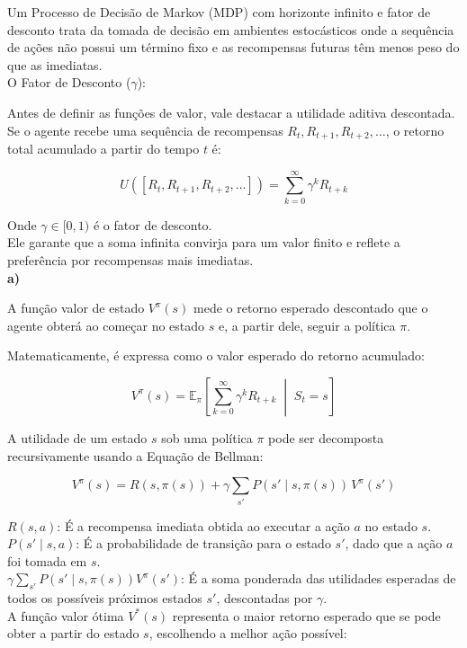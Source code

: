 \documentclass[a4paper,12pt]{article}
\begin{document}
Um Processo de Decisão de Markov (MDP) com horizonte infinito e fator de desconto trata da tomada de decisão em ambientes estocásticos onde a sequência de ações não possui um término fixo e as recompensas futuras têm menos peso do que as imediatas.\\

O Fator de Desconto ($\gamma$):

Antes de definir as funções de valor, vale destacar a utilidade aditiva descontada. Se o agente recebe uma sequência de recompensas $R_t, R_{t+1}, R_{t+2}, \dots$, o retorno total acumulado a partir do tempo $t$ é:

$$U([R_t, R_{t+1}, R_{t+2}, \dots]) = \sum_{k=0}^{\infty} \gamma^k R_{t+k}$$

Onde $\gamma \in [0, 1)$ é o fator de desconto. \\

Ele garante que a soma infinita convirja para um valor finito e reflete a preferência por recompensas mais imediatas.\\

\textbf{a)}

A função valor de estado $V^\pi(s)$ mede o retorno esperado descontado que o agente obterá ao começar no estado $s$ e, a partir dele, seguir a política $\pi$.

Matematicamente, é expressa como o valor esperado do retorno acumulado:

$$V^\pi(s) = \mathbb{E}_\pi \left[ \sum_{k=0}^{\infty} \gamma^k R_{t+k} \;\middle\vert{}\; S_t = s \right]$$


A utilidade de um estado $s$ sob uma política $\pi$ pode ser decomposta recursivamente usando a Equação de Bellman:

$$V^\pi(s) = R(s, \pi(s)) + \gamma \sum_{s'} P(s' \mid s, \pi(s)) \, V^\pi(s')$$

$R(s, a)$: É a recompensa imediata obtida ao executar a ação $a$ no estado $s$.\\

$P(s' \mid s, a)$: É a probabilidade de transição para o estado $s'$, dado que a ação $a$ foi tomada em $s$.\\

$\gamma \sum_{s'} P(s' \mid s, \pi(s)) V^\pi(s')$: É a soma ponderada das utilidades esperadas de todos os possíveis próximos estados $s'$, descontadas por $\gamma$.\\


A função valor ótima $V^*(s)$ representa o maior retorno esperado que se pode obter a partir do estado $s$, escolhendo a melhor ação possível:
\end{document}
